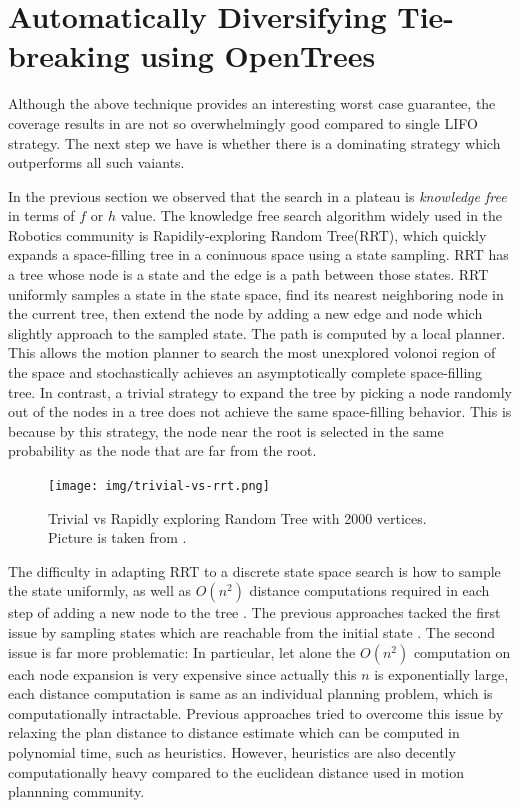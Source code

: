 \section{Automatically Diversifying Tie-breaking using OpenTrees}

Although the above technique provides an interesting worst case guarantee, the coverage results in  are not so overwhelmingly good compared to single LIFO strategy. The next step we have is whether there is a dominating strategy which outperforms all such vaiants.

In the previous section we observed that the search in a plateau is \emph{knowledge free} in terms of $f$ or $h$ value. The \sota knowledge free search algorithm widely used in the Robotics community is Rapidily-exploring Random Tree(RRT), which quickly expands a space-filling tree in a coninuous space using a state sampling.  RRT has a tree whose node is a state and the edge is a path between those states.
RRT uniformly samples a state in the state space, find its nearest neighboring node in the current tree, then extend the node by adding a new edge and node which slightly approach to the sampled state. The path is computed by a local planner.
This allows the motion planner to search the most unexplored volonoi region of the space and stochastically achieves an asymptotically complete space-filling tree.
In contrast, a trivial strategy to expand the tree by picking a node randomly out of the nodes in a tree does not achieve the same space-filling behavior. This is because by this strategy, the node near the root is selected in the same probability as the node that are far from the root.

\begin{figure}[htbp]
 \centering
 \texttt{[image: img/trivial-vs-rrt.png]}
 \caption{Trivial vs Rapidly exploring Random Tree with 2000 vertices. Picture is taken from \cite{lavalle2001randomized}.}
 \label{rrt}
\end{figure}

The difficulty in adapting RRT to a discrete state space search is how to sample the state uniformly, as well as $O(n^2)$ distance computations required in each step of adding a new node to the tree \cite{alcazar2011adapting}. The previous approaches tacked the first issue by sampling states which are reachable from the initial state \cite{alcazar2011adapting}. The second issue is far more problematic: In particular, let alone the $O(n^2)$ computation on each node expansion is very expensive since actually this $n$ is exponentially large, each distance computation is same as an individual planning problem, which is computationally intractable. Previous approaches tried to overcome this issue by relaxing the plan distance to distance estimate which can be computed in polynomial time, such as \ff heuristics. 
However, \ff heuristics are also decently computationally heavy compared to the euclidean distance used in motion plannning community.

